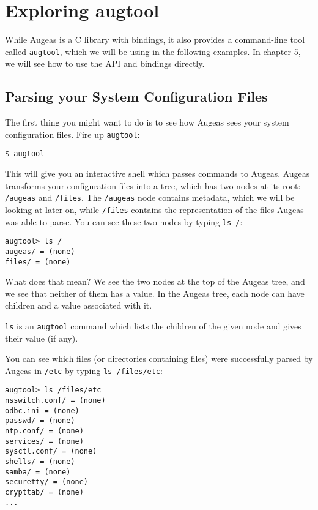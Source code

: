 \chapter{Exploring augtool}


While Augeas is a C library with bindings, it also provides a command-line tool called \verb!augtool!, which we will be using in the following examples. In chapter 5, we will see how to use the API and bindings directly.


\section{Parsing your System Configuration Files}

The first thing you might want to do is to see how Augeas sees your system configuration files. Fire up \verb!augtool!:

\begin{verbatim}
$ augtool
\end{verbatim}

This will give you an interactive shell which passes commands to Augeas. Augeas transforms your configuration files into a tree, which has two nodes at its root: \verb!/augeas! and \verb!/files!. The \verb!/augeas! node contains metadata, which we will be looking at later on, while \verb!/files! contains the representation of the files Augeas was able to parse. You can see these two nodes by typing \verb!ls /!:


\begin{verbatim}
augtool> ls /
augeas/ = (none)
files/ = (none)
\end{verbatim}

What does that mean? We see the two nodes at the top of the Augeas tree, and we see that neither of them has a value. In the Augeas tree, each node can have children and a value associated with it.

\verb!ls! is an \verb!augtool! command which lists the children of the given node and gives their value (if any).

You can see which files (or directories containing files) were successfully parsed by Augeas in \verb!/etc! by typing \verb!ls /files/etc!:

\begin{verbatim}
augtool> ls /files/etc
nsswitch.conf/ = (none)
odbc.ini = (none)
passwd/ = (none)
ntp.conf/ = (none)
services/ = (none)
sysctl.conf/ = (none)
shells/ = (none)
samba/ = (none)
securetty/ = (none)
crypttab/ = (none)
...
\end{verbatim}

